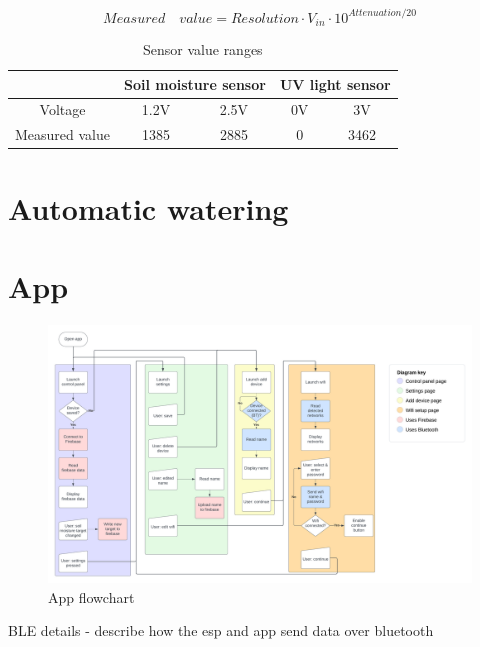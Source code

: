 \begin{equation}
\label{eqn:measured_val}
    Measured \quad value = Resolution \cdot V_{in} \cdot 10^{Attenuation / 20}
\end{equation}

\begin{table}[!h]
    \centering
    \begin{tabular}{|c|cc|cc|}
    \hline
         & \multicolumn{2}{c||}{Soil moisture sensor} & \multicolumn{2}{c|}{UV light sensor} \\
        \hline
        Voltage & 1.2V & 2.5V & 0V & 3V \\
        Measured value & 1385 & 2885 & 0 & 3462\\
        \hline
    \end{tabular}
    \caption{Sensor value ranges}
    \label{tab:sensor_ranges}
\end{table}

\section{Automatic watering}

\section{App}

\begin{figure}[!h]
    \centering
    \includegraphics[width= \textwidth]{Report/detail_design/fig/app_flow_detailed.png}
    \caption{App flowchart}
    \label{fig:app_flow_detailed}
\end{figure}

BLE details - describe how the esp and app send data over bluetooth

